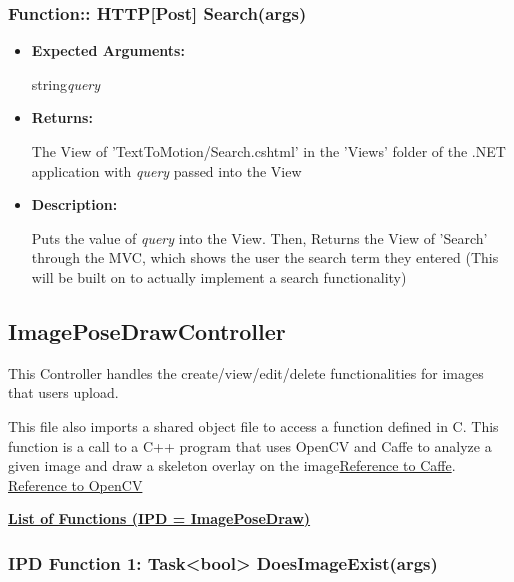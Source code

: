 \documentclass{scrreprt}
\begin{document}
\subsubsection{Function:: HTTP[Post] Search(args)}

\begin{itemize}
        \item \textbf{Expected Arguments:}

                string\quad\textit{query}

        \item \textbf{Returns:}

                The View of 'TextToMotion/Search.cshtml' in the 'Views' folder
                of the .NET application with \textit{query} passed into the
                View

        \item \textbf{Description:}

                Puts the value of \textit{query} into the View. Then, Returns
                the View of 'Search' through the MVC, which shows the user the
                search term they entered (This will be built on to actually
                implement a search functionality)

\end{itemize}


\subsection{ImagePoseDrawController}

This Controller handles the create/view/edit/delete functionalities for images
that users upload.

This file also imports a shared object file to access a function defined in C.
This function is a call to a C++ program that uses OpenCV and Caffe to analyze
a given image and draw a skeleton overlay on the image\href{http://caffe.berkeleyvision.org/doxygen/index.html}{Reference to Caffe}.
\href{http://docs.opencv.org/3.1.0/}{Reference to OpenCV}

\underline{ \textbf{List of Functions (IPD = ImagePoseDraw)}}

\subsubsection{IPD Function 1: Task\textless bool\textgreater
               DoesImageExist(args)}
\end{document}
